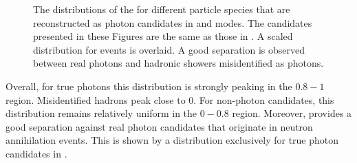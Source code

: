 \begin{figure}[htbp!]
    \centering
    \caption{\label{fig:zmva_distribution} The distributions of the \ZMVA for different particle species that are reconstructed as photon candidates in \feiBp and \feiBz modes.
    The candidates presented in these Figures are the same as those in .
    A scaled \ZMVA distribution for \BtoXsgamma events is overlaid.
    A good separation is observed between real photons and hadronic showers misidentified as photons.}
\end{figure}

Overall, for true photons this distribution is strongly peaking in the $0.8-1$ region.
Misidentified hadrons peak close to 0.
For non-\BtoXsgamma photon candidates, this distribution remains relatively uniform in the $0-0.8$ region.
Moreover, \ZMVA provides a good separation against real photon candidates that originate in neutron annihilation events.
This is shown by a \ZMVA distribution exclusively for true photon candidates in .

